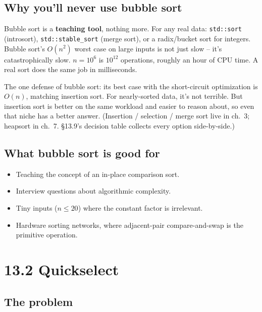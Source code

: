 \documentclass[11pt]{article}
\begin{document}
\subsection*{Why you'll never use bubble sort}

\begin{warnbox}
Bubble sort is a \textbf{teaching tool}, nothing more. For any real data: \texttt{std::sort} (introsort), \texttt{std::stable\_sort} (merge sort), or a radix/bucket sort for integers. Bubble sort's $O(n^2)$ worst case on large inputs is not just slow -- it's catastrophically slow. $n = 10^6$ is $10^{12}$ operations, roughly an hour of CPU time. A real sort does the same job in milliseconds.
\end{warnbox}

\begin{notebox}
The one defense of bubble sort: its best case with the short-circuit optimization is $O(n)$, matching insertion sort. For nearly-sorted data, it's not terrible. But insertion sort is better on the same workload and easier to reason about, so even that niche has a better answer. (Insertion / selection / merge sort live in ch.~3; heapsort in ch.~7. \S13.9's decision table collects every option side-by-side.)
\end{notebox}

\subsection*{What bubble sort is good for}

\begin{itemize}[leftmargin=*]
    \item Teaching the concept of an in-place comparison sort.
    \item Interview questions about algorithmic complexity.
    \item Tiny inputs ($n \leq 20$) where the constant factor is irrelevant.
    \item Hardware sorting networks, where adjacent-pair compare-and-swap is the primitive operation.
\end{itemize}

\section{13.2 Quickselect}

\subsection*{The problem}
\end{document}

